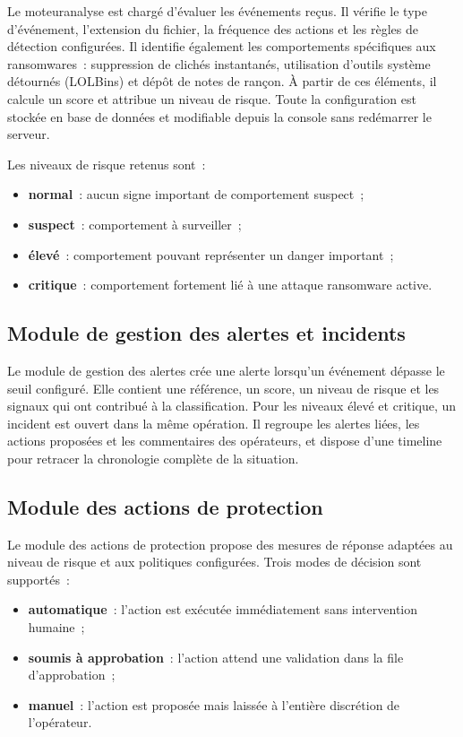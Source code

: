 Le \gls{moteuranalyse} est chargé d'évaluer les événements reçus. Il vérifie le type d'événement, l'extension du fichier, la fréquence des actions et les règles de détection configurées. Il identifie également les comportements spécifiques aux ransomwares~: suppression de clichés instantanés, utilisation d'outils système détournés (LOLBins) et dépôt de notes de rançon. À partir de ces éléments, il calcule un score et attribue un niveau de risque. Toute la configuration est stockée en base de données et modifiable depuis la console sans redémarrer le serveur.

Les niveaux de risque retenus sont~:

\begin{itemize}
    \item \textbf{normal}~: aucun signe important de comportement suspect~;
    \item \textbf{suspect}~: comportement à surveiller~;
    \item \textbf{élevé}~: comportement pouvant représenter un danger important~;
    \item \textbf{critique}~: comportement fortement lié à une attaque ransomware active.
\end{itemize}

\subsection{Module de gestion des alertes et incidents}

Le module de gestion des alertes crée une alerte lorsqu'un événement dépasse le seuil configuré. Elle contient une référence, un score, un niveau de risque et les signaux qui ont contribué à la classification. Pour les niveaux élevé et critique, un \gls{incident} est ouvert dans la même opération. Il regroupe les alertes liées, les actions proposées et les commentaires des opérateurs, et dispose d'une timeline pour retracer la chronologie complète de la situation.

\subsection{Module des actions de protection}

Le module des actions de protection propose des mesures de réponse adaptées au niveau de risque et aux politiques configurées. Trois modes de décision sont supportés~:

\begin{itemize}
    \item \textbf{automatique}~: l'action est exécutée immédiatement sans intervention humaine~;
    \item \textbf{soumis à approbation}~: l'action attend une validation dans la file d'approbation~;
    \item \textbf{manuel}~: l'action est proposée mais laissée à l'entière discrétion de l'opérateur.
\end{itemize}

